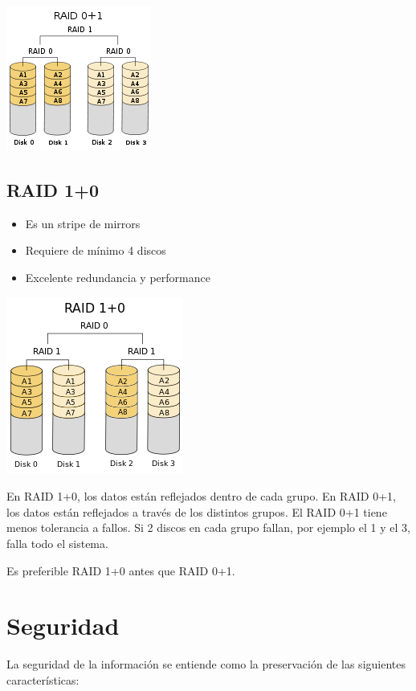 \includegraphics[scale=1.3]{imagenes/raid0+1}

\subsection{RAID 1+0}

\begin{itemize}
\item Es un stripe de mirrors
\item Requiere de mínimo 4 discos
\item Excelente redundancia y performance
\end{itemize}

\includegraphics[scale=1.3]{imagenes/raid1+0}

En RAID 1+0, los datos están reflejados dentro de cada grupo. En RAID 0+1, los datos están reflejados a través de los distintos grupos. El RAID 0+1 tiene menos tolerancia a fallos. Si 2 discos en cada grupo fallan, por ejemplo el 1 y el 3, falla todo el sistema.

Es preferible RAID 1+0 antes que RAID 0+1.

\newpage

\section{Seguridad}

La seguridad de la información se entiende como la preservación de las siguientes características:

